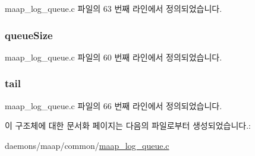 maap\+\_\+log\+\_\+queue.\+c 파일의 63 번째 라인에서 정의되었습니다.

\subsubsection[{\texorpdfstring{queue\+Size}{queueSize}}]{ queue\+Size}\hypertarget{structmaap__log__queue_acdc388d91657198c5b07921a3d849f23}{}\label{structmaap__log__queue_acdc388d91657198c5b07921a3d849f23}


maap\+\_\+log\+\_\+queue.\+c 파일의 60 번째 라인에서 정의되었습니다.

\subsubsection[{\texorpdfstring{tail}{tail}}]{ tail}\hypertarget{structmaap__log__queue_a3da51da0aebd2ac8b1ab802259126311}{}\label{structmaap__log__queue_a3da51da0aebd2ac8b1ab802259126311}


maap\+\_\+log\+\_\+queue.\+c 파일의 66 번째 라인에서 정의되었습니다.



이 구조체에 대한 문서화 페이지는 다음의 파일로부터 생성되었습니다.\+:\begin{DoxyCompactItemize}
\item 
daemons/maap/common/\hyperlink{maap__log__queue_8c}{maap\+\_\+log\+\_\+queue.\+c}\end{DoxyCompactItemize}
